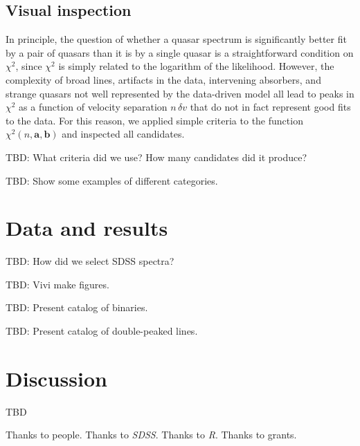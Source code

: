 \documentclass[preprint]{aastex}
\newcommand{\project}[1]{\textsl{#1}}
\newcommand{\SDSS}{\project{SDSS}}
\newcommand{\mmatrix}[1]{\boldsymbol{#1}}
\newcommand{\avec}{\mmatrix{a}}
\newcommand{\bvec}{\mmatrix{b}}
\begin{document}
\subsection{Visual inspection}

In principle, the question of whether a quasar spectrum is
significantly better fit by a pair of quasars than it is by a single
quasar is a straightforward condition on $\chi^2$, since $\chi^2$ is
simply related to the logarithm of the likelihood.  However, the
complexity of broad lines, artifacts in the data, intervening
absorbers, and strange quasars not well represented by the data-driven
model all lead to peaks in $\chi^2$ as a function of velocity
separation $n\,\delta v$ that do not in fact represent good fits to
the data.  For this reason, we applied simple criteria to the function
$\chi^2(n,\avec,\bvec)$ and inspected all candidates.

TBD:  What criteria did we use?  How many candidates did it produce?

TBD:  Show some examples of different categories.

\section{Data and results}

TBD:  How did we select SDSS spectra?

TBD:  Vivi make figures.

TBD:  Present catalog of binaries.

TBD:  Present catalog of double-peaked lines.

\section{Discussion}

TBD

\acknowledgements Thanks to people.  Thanks to \SDSS.  Thanks to
\project{R}.  Thanks to grants.
\end{document}
